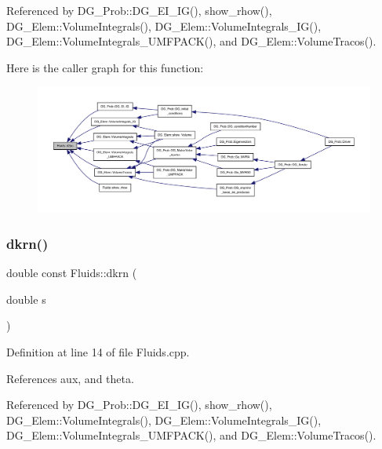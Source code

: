 Referenced by D\+G\+\_\+\+Prob\+::\+D\+G\+\_\+\+E\+I\+\_\+\+I\+G(), show\+\_\+rhow(), D\+G\+\_\+\+Elem\+::\+Volume\+Integrals(), D\+G\+\_\+\+Elem\+::\+Volume\+Integrals\+\_\+\+I\+G(), D\+G\+\_\+\+Elem\+::\+Volume\+Integrals\+\_\+\+U\+M\+F\+P\+A\+C\+K(), and D\+G\+\_\+\+Elem\+::\+Volume\+Tracos().

Here is the caller graph for this function\+:
\nopagebreak
\begin{figure}[H]
\begin{center}
\leavevmode
\includegraphics[width=350pt]{classFluids_a860c3c2af6dae8c158a78770dfc76ce8_icgraph}
\end{center}
\end{figure}
\mbox{\label{classFluids_a66c100be378f015b8bbe47a0e0c176c1}} 
\subsubsection{\texorpdfstring{dkrn()}{dkrn()}}
{\footnotesize\ttfamily double const Fluids\+::dkrn (\begin{DoxyParamCaption}\item[{double}]{s }\end{DoxyParamCaption})}



Definition at line 14 of file Fluids.\+cpp.



References aux, and theta.



Referenced by D\+G\+\_\+\+Prob\+::\+D\+G\+\_\+\+E\+I\+\_\+\+I\+G(), show\+\_\+rhow(), D\+G\+\_\+\+Elem\+::\+Volume\+Integrals(), D\+G\+\_\+\+Elem\+::\+Volume\+Integrals\+\_\+\+I\+G(), D\+G\+\_\+\+Elem\+::\+Volume\+Integrals\+\_\+\+U\+M\+F\+P\+A\+C\+K(), and D\+G\+\_\+\+Elem\+::\+Volume\+Tracos().

